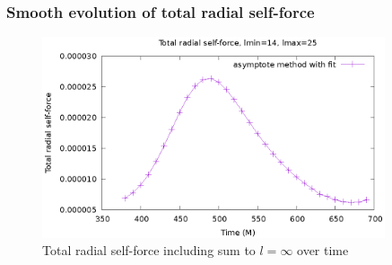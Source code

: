 \documentclass{beamer}
\begin{document}
\begin{frame}
  \frametitle{Smooth evolution of total radial self-force}
  \begin{figure}
    \includegraphics[width=0.9\textwidth]{totalselfforcevt2}
     \caption{Total radial self-force including sum to $l=\infty$ over time}
  \end{figure}
\end{frame}
\end{document}
